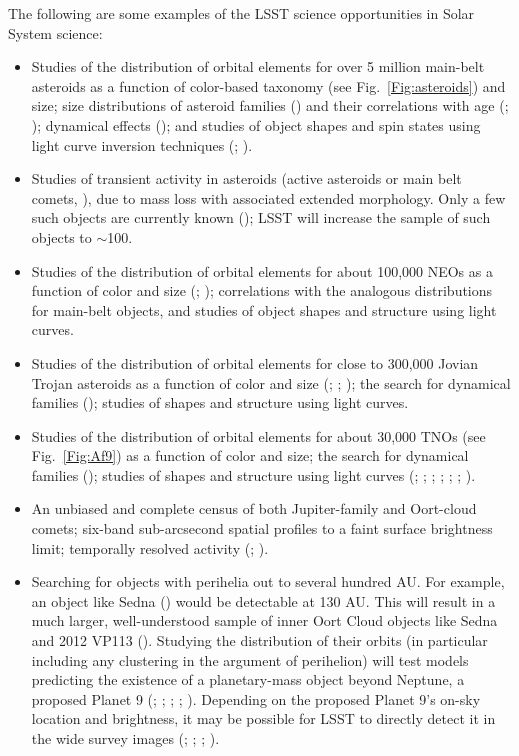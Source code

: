 The following are some examples of the LSST science opportunities in
Solar System science:
\begin{itemize}
\item Studies of the distribution of orbital elements for over 5 million main-belt
asteroids as a function of color-based taxonomy (see Fig.~\ref{Fig:asteroids})
and size; size distributions of asteroid families (\cite{Parker2008}) and their
correlations with age (\cite{Jedicke2004}; \cite{Nesvorny2005}); dynamical
effects (\cite{Bottke2001}); and studies of object shapes and spin states using
light curve inversion techniques (\cite{Pravec2000}; \cite{Durech2009}).
\item Studies of transient activity in asteroids (active asteroids or main belt comets,
\cite{Hsieh2006}),  due to mass loss with associated extended
morphology.  Only a few such objects are currently known (\cite{Jewitt2011,Jewitt2012});
LSST
will increase the sample of such objects to $\sim$100.
\item Studies of the distribution of orbital elements for about 100,000 NEOs as a
function of color and size (\cite{Rabinowitz1993}; \cite{Dandy2002});
correlations with the analogous distributions for
main-belt objects, and studies of object shapes and structure using light curves.
\item Studies of the distribution of orbital elements for close to 300,000 Jovian Trojan
asteroids as a function of color and size (\cite{Jewitt2000}; \cite{Yoshida2005};
\cite{Szabo2007}); the search for dynamical families
(\cite{Knezevic2005}); studies of shapes and structure using light curves.
\item Studies of the distribution of orbital elements for about 30,000 TNOs (see
Fig.~\ref{Fig:Af9}) as a function of color and size; the search for dynamical families
(\cite{Marcus2011}); studies of shapes and structure using light curves (\cite{Duncan1995};
\cite{Trujillo2001}; \cite{Gladman2001}; \cite{Bernstein2004};
\cite{Elliot2005}; \cite{Jones2006}; \cite{Doressoundiram2007}).
\item An unbiased and complete census of both Jupiter-family and Oort-cloud
comets; six-band sub-arcsecond spatial profiles to a faint surface brightness
limit; temporally resolved activity (\cite{Lowry1999}; \cite{AHearn2004}).
\item Searching for objects with perihelia out to several hundred AU. For example, an object
like Sedna (\cite{Brown2004}) would be detectable at 130 AU. This will result
in a much larger, well-understood sample of inner Oort Cloud objects like Sedna and 2012 VP113
 (\cite{Trujillo2014}).  Studying the distribution of their orbits (in particular including any
clustering in the argument of perihelion) will test models predicting the existence of a planetary-mass object beyond Neptune, a proposed Planet 9 (\cite{Trujillo2014};  \cite{Batygin2016}; \cite{Brown2016}; \cite{Sheppard2016}; \cite{Brown2017}). Depending on the proposed Planet 9's on-sky location and brightness, it may be possible for LSST to directly detect it in the wide survey images (\cite{Batygin2016}; \cite{Brown2016}; \cite{Sheppard2016}; \cite{Brown2017}).


\end{itemize}
